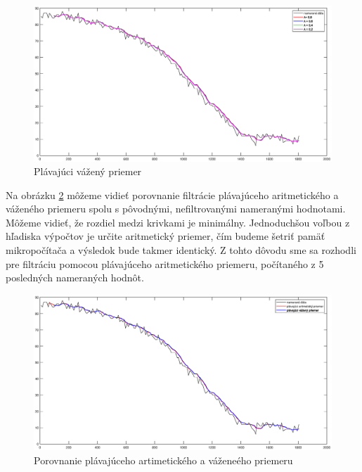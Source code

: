 \begin{figure}
	\centering
	\includegraphics[width=170mm]{obr/plavajuciVazeny.eps}
	\caption{Plávajúci vážený priemer}\label{OBRAZOK 3.3.1.3} 
\end{figure}


Na obrázku \ref{OBRAZOK 3.3.1.4} môžeme vidieť porovnanie filtrácie plávajúceho aritmetického a váženého priemeru spolu s pôvodnými, nefiltrovanými nameranými hodnotami. Môžeme vidieť, že rozdiel medzi krivkami je minimálny. Jednoduchšou voľbou z hľadiska výpočtov je určite aritmetický priemer, čím budeme šetriť pamäť mikropočítača a výsledok bude takmer identický. Z tohto dôvodu sme sa rozhodli pre filtráciu pomocou plávajúceho aritmetického priemeru, počítaného z 5 posledných nameraných hodnôt.  

\begin{figure}
	\centering
	\includegraphics[width=170mm]{obr/aritmetickyVSvazeny.eps}
	\caption{Porovnanie plávajúceho artimetického a váženeého priemeru}\label{OBRAZOK 3.3.1.4} 
\end{figure}
